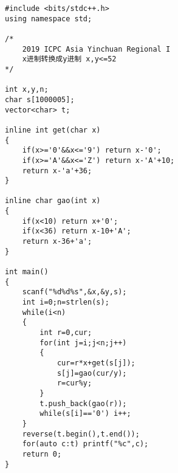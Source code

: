 \begin{lstlisting}
#include <bits/stdc++.h>
using namespace std;

/*
    2019 ICPC Asia Yinchuan Regional I
    x进制转换成y进制 x,y<=52
*/

int x,y,n;
char s[1000005];
vector<char> t;

inline int get(char x)
{
    if(x>='0'&&x<='9') return x-'0';
    if(x>='A'&&x<='Z') return x-'A'+10;
    return x-'a'+36;
}

inline char gao(int x)
{
    if(x<10) return x+'0';
    if(x<36) return x-10+'A';
    return x-36+'a';
}

int main()
{
    scanf("%d%d%s",&x,&y,s);
    int i=0;n=strlen(s);
    while(i<n)
    {
        int r=0,cur;
        for(int j=i;j<n;j++)
        {
            cur=r*x+get(s[j]);
            s[j]=gao(cur/y);
            r=cur%y;
        }
        t.push_back(gao(r));
        while(s[i]=='0') i++;
    }
    reverse(t.begin(),t.end());
    for(auto c:t) printf("%c",c);
    return 0;
}
\end{lstlisting}